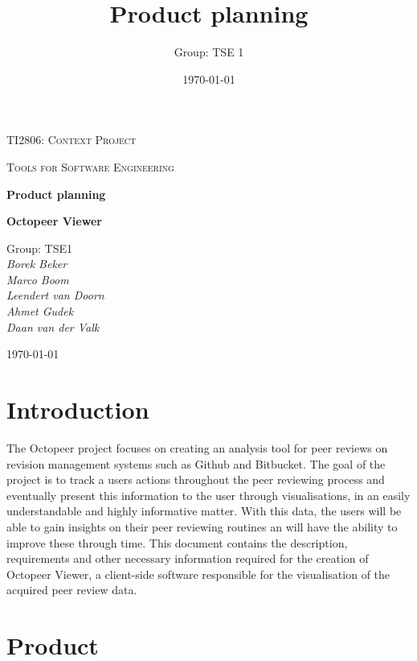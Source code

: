 \documentclass{article}
\title{Product planning}
\author{Group: TSE 1}
\date{\today}
\begin{document}
\begin{titlepage}
	\centering
	{\scshape\LARGE TI2806: Context Project \par}
	\vspace{1cm}
	{\scshape\Large Tools for Software Engineering\par}
	\vspace{1.5cm}
	{\huge\bfseries Product planning\par}
	\vspace{0.5cm}
	{\Large\bfseries Octopeer Viewer\par}
	\vspace{2cm}
	{\Large
	  Group: TSE1 \\
	  \vspace{0.5cm}
	  \itshape
        Borek Beker \\
        Marco Boom \\
        Leendert van Doorn \\
        Ahmet Gudek \\
        Daan van der Valk \\
    \par}

	\vfill

	{\large \today\par}
\end{titlepage}

\section{Introduction}

The Octopeer project focuses on creating an analysis tool for peer reviews on revision management systems such as Github and Bitbucket. The goal of the project is to track a users actions throughout the peer reviewing process and eventually present this information to the user through visualisations, in an easily understandable and highly informative matter. With this data, the users will be able to gain insights on their peer reviewing routines an will have the ability to improve these through time. This document contains the description, requirements and other necessary information required for the creation of Octopeer Viewer, a client-side software responsible for the visualisation of the acquired peer review data. 

\section{Product}
\end{document}
